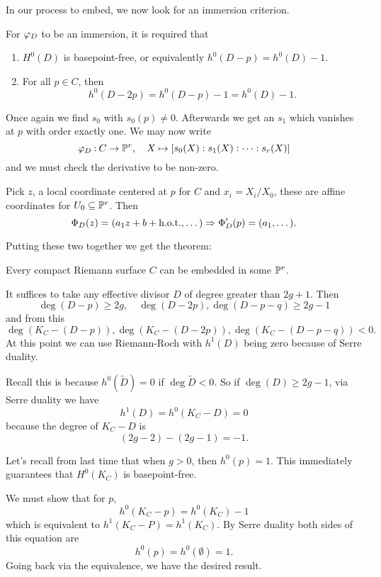 \documentclass[12pt]{memoir}
\begin{document}
In our process to embed, we now look for an immersion criterion.

\begin{Prop}
    For $\varphi_D$ to be an immersion, it is required that
    \begin{enumerate}
        \item $H^0(D)$ is basepoint-free, or equivalently $h^0(D-p)=h^0(D)-1$.
        \item For all $p\in C$, then 
        $$h^0(D-2p)=h^0(D-p)-1=h^0(D)-1.$$
    \end{enumerate}
\end{Prop}

\begin{ptcbp}
    Once again we find $s_0$ with $s_0(p)\neq 0$. Afterwards we get an $s_1$ which vanishes at $p$ with order exactly one. We may now write
    $$\varphi_D\mathbin{:} C\to\mathbb{P}^r,\quad X\mapsto[s_0(X):s_1(X):\dots:s_r(X)]$$
    and we must check the derivative to be non-zero.\par
    Pick $z$, a local coordinate centered at $p$ for $C$ and $x_i=X_i/X_0$, these are affine coordinates for $U_0\subseteq\mathbb{P}^r$. Then 
    $$\Phi_D(z)=(a_1z+b+\text{h.o.t.},\dots)\Rightarrow\Phi_D'(p)=(a_1,\dots).$$
\end{ptcbp}

Putting these two together we get the theorem:

\begin{Th}
    Every compact Riemann surface $C$ can be embedded in some $\mathbb{P}^r$.
\end{Th}

\begin{ptcbp}
    It suffices to take any effective divisor $D$ of degree greater than $2g+1$. Then 
    $$\deg(D-p)\geq 2g,\quad \deg(D-2p),\deg(D-p-q)\geq 2g-1$$
    and from this 
    $$\deg(K_C-(D-p)),\deg(K_C-(D-2p)),\deg(K_C-(D-p-q))<0.$$
    At this point we can use Riemann-Roch with $h^1(D)$ being zero because of Serre duality.\par
    Recall this is because $h^0(\tilde{D})=0$ if $\deg\tilde{D}<0$. So if $\deg(D)\geq 2g-1$, via Serre duality we have 
    $$h^1(D)=h^0(K_C-D)=0$$
    because the degree of $K_C-D$ is 
    $$(2g-2)-(2g-1)=-1.$$
\end{ptcbp}

Let's recall from last time that when $g>0$, then $h^0(p)=1$. This immediately guarantees that $H^0(K_C)$ is basepoint-free. 

\begin{ptcb}
    We must show that for $p$, 
    $$h^0(K_C-p)=h^0(K_C)-1$$
    which is equivalent to $h^1(K_C-P)=h^1(K_C)$. By Serre duality both sides of this equation are 
    $$h^0(p)=h^0(\emptyset)=1.$$
    Going back via the equivalence, we have the desired result.
\end{ptcb}
\end{document}
